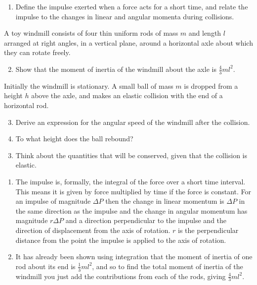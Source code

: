 \begin{hint}
{
\begin{enumerate}
\item Define the impulse exerted when a force acts for a short time, and relate the impulse to the changes in linear and angular momenta during collisions. 
\end{enumerate}
A toy windmill consists of four thin uniform rods of mass $m$ and length $l$ arranged at right angles, in a vertical plane, around a horizontal axle about which they can rotate freely. 
\begin{enumerate}
\setcounter{enumi}{1}
\item Show that the moment of inertia of the windmill about the axle is $\frac{4}{3}ml^2$.
\end{enumerate}
Initially the windmill is stationary. A small ball of mass $m$ is dropped from a height $h$ above the axle, and makes an elastic collision with the end of a horizontal rod. 
\begin{enumerate}
\setcounter{enumi}{2}
\item Derive an expression for the angular speed of the windmill after the collision.
\item To what height does the ball rebound?
\end{enumerate}
}
{
\begin{enumerate}
\setcounter{enumi}{2}
\item Think about the quantities that will be conserved, given that the collision is elastic. 
\end{enumerate}
}
{%
}
{
\begin{enumerate}
\item The impulse is, formally, the integral of the force over a short time interval. This means it is given by force multiplied by time if the force is constant. For an impulse of magnitude $\Delta P$ then the change in linear momentum is $\Delta P$ in the same direction as the impulse and the change in angular momentum has magnitude $r\Delta P$ and a direction perpendicular to the impulse and the direction of displacement from the axis of rotation. $r$ is the perpendicular distance from the point the impulse is applied to the axis of rotation. 
\item It has already been shown using integration that the moment of inertia of one rod about its end is $\frac{1}{3}ml^2$, and so to find the total moment of inertia of the windmill you just add the contributions from each of the rods, giving $\frac{4}{3}ml^2$. 

\end{enumerate}}
\end{hint}
